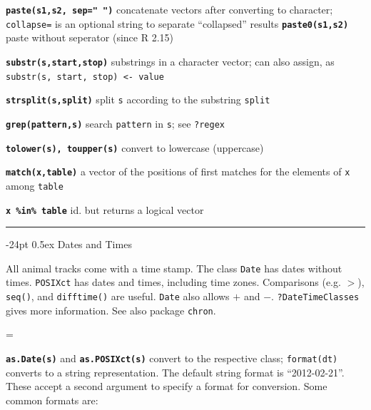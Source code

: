 \documentclass[8pt,landscape]{article}
\makeatletter
\renewcommand\section{\@startsection{section}{1}{0mm}%
                                     {-24pt}%
                                     {0.5ex}%
                                {\color{blue}\normalfont\large\bfseries}}
\newcommand{\code}{\texttt}
\newcommand{\bcode}[1]{\texttt{\textbf{#1}}}
\makeatother
\begin{document}
\begin{multicols*}{3}
\bcode{paste(s1,s2, sep=" ")} concatenate vectors after converting to character; 
\code{collapse=} is an optional string to separate ``collapsed'' results
\bcode{paste0(s1,s2)} paste without seperator (since R 2.15)

\bcode{substr(s,start,stop)} substrings in a character vector; can also assign, as \code{substr(s, start, stop) <- value}

\bcode{strsplit(s,split)} split \code{s} according to the substring \code{split}

\bcode{grep(pattern,s)} search \code{pattern} in \code{s}; see \code{?regex}


\bcode{tolower(s), toupper(s)} convert to lowercase (uppercase)

\bcode{match(x,table)} a vector of the positions of first matches for the elements of \code{x} among \code{table}

\bcode{x \%in\% table} id. but returns a logical vector 



\bigskip

\rule{.3\textwidth}{0.4pt}

\section{Dates and Times}

All animal tracks come with a time stamp. The class \code{Date} has dates without times.  \code{POSIXct} has
dates and times, including time zones. Comparisons (e.g. $>$),
\code{seq()}, and \code{difftime()} are useful. \code{Date} also allows
$+$ and $-$. \code{?DateTimeClasses} gives more information. See also package
\code{chron}.

 \bigskip

\everypar={\hangindent=9mm}

\bcode{as.Date(s)} and \bcode{as.POSIXct(s)} convert to the respective
class; \code{format(dt)} converts to a string representation. The
default string format is ``2012-02-21''. These accept a second argument
to specify a format for conversion. Some common formats are:


\end{multicols*}
\end{document}
